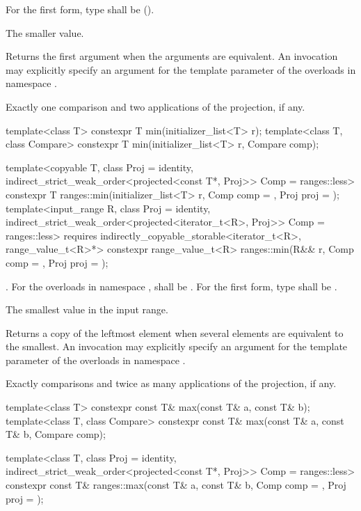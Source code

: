 \begin{itemdescr}
\pnum
\requires
For the first form, type  shall be
 ().

\pnum
\returns
The smaller value.

\pnum
\remarks
Returns the first argument when the arguments are equivalent.
An invocation may explicitly specify
an argument for the template parameter 
of the overloads in namespace .

\pnum
\complexity
Exactly one comparison and two applications of the projection, if any.
\end{itemdescr}

%
\begin{itemdecl}
template<class T>
  constexpr T min(initializer_list<T> r);
template<class T, class Compare>
  constexpr T min(initializer_list<T> r, Compare comp);

template<copyable T, class Proj = identity,
         indirect_strict_weak_order<projected<const T*, Proj>> Comp = ranges::less>
  constexpr T ranges::min(initializer_list<T> r, Comp comp = {}, Proj proj = {});
template<input_range R, class Proj = identity,
         indirect_strict_weak_order<projected<iterator_t<R>, Proj>> Comp = ranges::less>
  requires indirectly_copyable_storable<iterator_t<R>, range_value_t<R>*>
  constexpr range_value_t<R>
    ranges::min(R&& r, Comp comp = {}, Proj proj = {});
\end{itemdecl}

\begin{itemdescr}
\pnum
\requires
{}.
For the overloads in namespace ,
 shall be .
For the first form, type  shall be .

\pnum
\returns
The smallest value in the input range.

\pnum
\remarks
Returns a copy of the leftmost element
when several elements are equivalent to the smallest.
An invocation may explicitly specify
an argument for the template parameter 
of the overloads in namespace .

\pnum
\complexity
Exactly  comparisons
and twice as many applications of the projection, if any.
\end{itemdescr}

%
\begin{itemdecl}
template<class T>
  constexpr const T& max(const T& a, const T& b);
template<class T, class Compare>
  constexpr const T& max(const T& a, const T& b, Compare comp);

template<class T, class Proj = identity,
         indirect_strict_weak_order<projected<const T*, Proj>> Comp = ranges::less>
  constexpr const T& ranges::max(const T& a, const T& b, Comp comp = {}, Proj proj = {});
\end{itemdecl}

